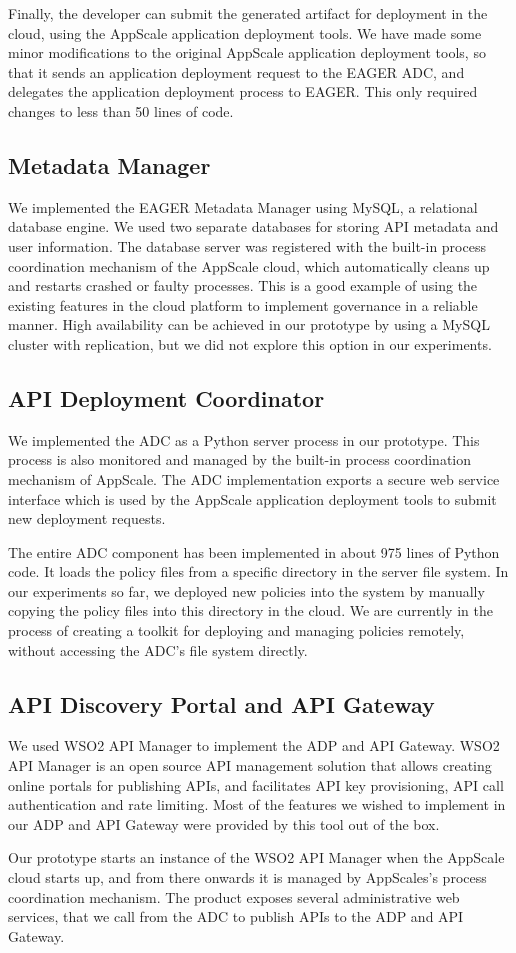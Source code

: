 Finally, the developer can submit the generated artifact for deployment in the cloud, using the AppScale application deployment tools. We have
made some minor modifications to the original AppScale application deployment tools, so that it sends an application deployment request to
the EAGER ADC, and delegates the application deployment process to EAGER. This only required changes to less than 50 lines of code.

\subsection{Metadata Manager}
We implemented the EAGER Metadata Manager using MySQL, a relational database engine. We used two separate databases for storing API metadata
and user information. The database server was registered with the built-in process coordination mechanism of the AppScale cloud, which automatically
cleans up and restarts crashed or faulty processes. This is a good example of using the existing features in the cloud platform to implement
governance in a reliable manner. High availability can be achieved in our prototype by using a MySQL cluster with replication, but we did not explore
this option in our experiments.

\subsection{API Deployment Coordinator}
We implemented the ADC as a Python server process in our prototype. This process is also monitored and managed by the built-in process
coordination mechanism of AppScale. The ADC implementation exports a secure web service interface which is used by the AppScale application 
deployment tools to submit new deployment requests.

The entire ADC component has been implemented in about 975 lines of Python code. It loads the policy files from a specific directory in 
the server file system. In our experiments so far, we deployed new policies into the system by manually copying the policy files into this 
directory in the cloud. We are currently in the process of creating a toolkit for deploying and managing policies remotely, without accessing 
the ADC's file system directly.

\subsection{API Discovery Portal and API Gateway}
We used WSO2 API Manager to implement the ADP and API Gateway. WSO2 API Manager is an open source API management solution that
allows creating online portals for publishing APIs, and facilitates API key provisioning, API call authentication and rate limiting. Most of the features
we wished to implement in our ADP and API Gateway were provided by this tool out of the box. 

Our prototype starts an instance of the WSO2 API Manager when
the AppScale cloud starts up, and from there onwards it is managed by AppScales's process coordination mechanism. The product exposes several
administrative web services, that we call from the ADC to publish APIs to the ADP and API Gateway. 
